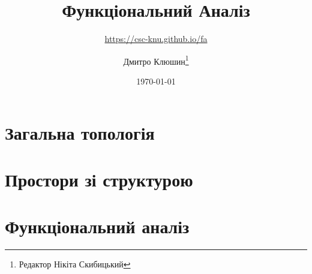 \documentclass[a4paper,11pt,twoside=semi,openright,numbers=noenddot]{scrbook}
\title{Функціональний Аналіз}
\subtitle{\url{https://csc-knu.github.io/fa}}
\author{Дмитро Клюшин\thanks{Редактор Нікіта Скибицький}}
\date{\today}
\begin{document}
\frontmatter

\maketitle

\thispagestyle{empty}





\tableofcontents

\mainmatter

\part{Загальна топологія}
\parttoc






\part{Простори зі структурою}
\parttoc






\part{Функціональний аналіз}
\parttoc







\end{document}

